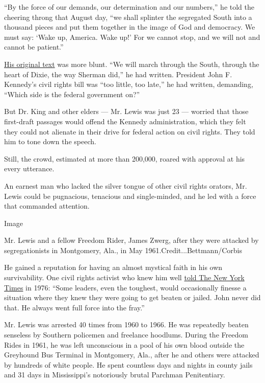 ``By the force of our demands, our determination and our numbers,'' he
told the cheering throng that August day, ``we shall splinter the
segregated South into a thousand pieces and put them together in the
image of God and democracy. We must say: `Wake up, America. Wake up!'
For we cannot stop, and we will not and cannot be patient.''

\href{https://www.crmvet.org/info/mowjl.htm}{His original text} was more
blunt. ``We will march through the South, through the heart of Dixie,
the way Sherman did,'' he had written. President John F. Kennedy's civil
rights bill was ``too little, too late,'' he had written, demanding,
``Which side is the federal government on?''

But Dr. King and other elders --- Mr. Lewis was just 23 --- worried that
those first-draft passages would offend the Kennedy administration,
which they felt they could not alienate in their drive for federal
action on civil rights. They told him to tone down the speech.

Still, the crowd, estimated at more than 200,000, roared with approval
at his every utterance.

An earnest man who lacked the silver tongue of other civil rights
orators, Mr. Lewis could be pugnacious, tenacious and single-minded, and
he led with a force that commanded attention.

Image

Mr. Lewis and a fellow Freedom Rider, James Zwerg, after they were
attacked by segregationists in Montgomery, Ala., in May
1961.Credit...Bettmann/Corbis

He gained a reputation for having an almost mystical faith in his own
survivability. One civil rights activist who knew him well
\href{https://www.nytimes.com/1976/11/14/archives/john-lewis-is-a-personal-symbol-for-a-historic-period-black-passage.html}{told
The New York Times} in 1976: ``Some leaders, even the toughest, would
occasionally finesse a situation where they knew they were going to get
beaten or jailed. John never did that. He always went full force into
the fray.''

Mr. Lewis was arrested 40 times from 1960 to 1966. He was repeatedly
beaten senseless by Southern policemen and freelance hoodlums. During
the Freedom Rides in 1961, he was left unconscious in a pool of his own
blood outside the Greyhound Bus Terminal in Montgomery, Ala., after he
and others were attacked by hundreds of white people. He spent countless
days and nights in county jails and 31 days in Mississippi's notoriously
brutal Parchman Penitentiary.

